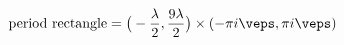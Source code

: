\begin{equation}
\text{period rectangle}=
\big(-\frac{\lambda}{2},\frac{9\lambda}{2}\big)\times
(-\pi i\veps,\pi i\veps)
\end{equation}

